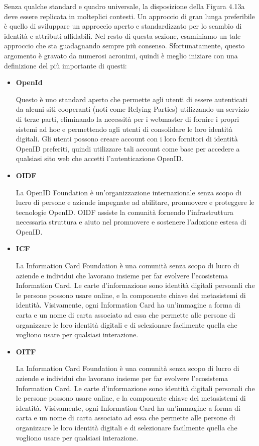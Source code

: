 Senza qualche standard e quadro universale, la disposizione della Figura 4.13a deve essere replicata in molteplici contesti. Un approccio di gran lunga preferibile è quello di sviluppare un approccio aperto e standardizzato per lo scambio di identità e attributi affidabili. Nel resto di questa sezione, esaminiamo un tale approccio che sta guadagnando sempre più consenso. Sfortunatamente, questo argomento è gravato da numerosi acronimi, quindi è meglio iniziare con una definizione del più importante di questi:
\begin{itemize}
    \item \textbf{OpenId}
    
    Questo è uno standard aperto che permette agli utenti di essere autenticati da alcuni siti cooperanti (noti come Relying Parties) utilizzando un servizio di terze parti, eliminando la necessità per i webmaster di fornire i propri sistemi ad hoc e permettendo agli utenti di consolidare le loro identità digitali. Gli utenti possono creare account con i loro fornitori di identità OpenID preferiti, quindi utilizzare tali account come base per accedere a qualsiasi sito web che accetti l'autenticazione OpenID.
    
    \item \textbf{OIDF}
    
    La OpenID Foundation è un'organizzazione internazionale senza scopo di lucro di persone e aziende impegnate ad abilitare, promuovere e proteggere le tecnologie OpenID. OIDF assiste la comunità fornendo l'infrastruttura necessaria struttura e aiuto nel promuovere e sostenere l'adozione estesa di OpenID.
    
    \item \textbf{ICF}
    
    La Information Card Foundation è una comunità senza scopo di lucro di aziende e individui che lavorano insieme per far evolvere l'ecosistema Information Card. Le carte d'informazione sono identità digitali personali che le persone possono usare online, e la componente chiave dei metasistemi di identità. Visivamente, ogni Information Card ha un'immagine a forma di carta e un nome di carta associato ad essa che permette alle persone di organizzare le loro identità digitali e di selezionare facilmente quella che vogliono usare per qualsiasi interazione.
    
    \item \textbf{OITF}
    
    La Information Card Foundation è una comunità senza scopo di lucro di aziende e individui che lavorano insieme per far evolvere l'ecosistema Information Card. Le carte d'informazione sono identità digitali personali che le persone possono usare online, e la componente chiave dei metasistemi di identità. Visivamente, ogni Information Card ha un'immagine a forma di carta e un nome di carta associato ad essa che permette alle persone di organizzare le loro identità digitali e di selezionare facilmente quella che vogliono usare per qualsiasi interazione.
    

\end{itemize}
